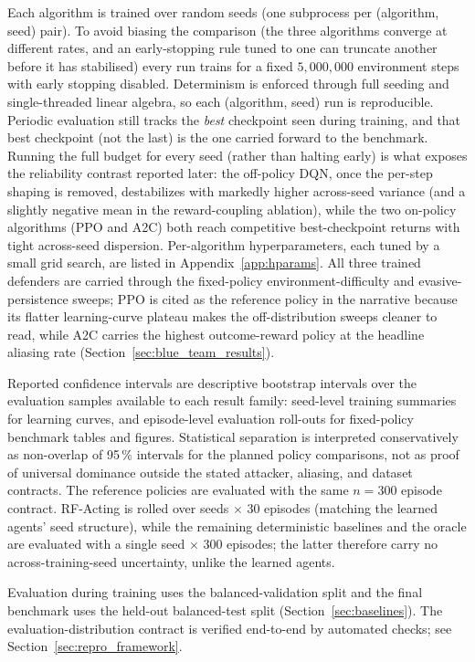Each algorithm is trained over \NumSeeds{} random seeds (one subprocess per (algorithm, seed) pair). To avoid biasing the comparison (the three algorithms converge at different rates, and an early-stopping rule tuned to one can truncate another before it has stabilised) every run trains for a fixed $5{,}000{,}000$ environment steps with early stopping disabled. Determinism is enforced through full seeding and single-threaded linear algebra, so each (algorithm, seed) run is reproducible. Periodic evaluation still tracks the \emph{best} checkpoint seen during training, and that best checkpoint (not the last) is the one carried forward to the benchmark. Running the full budget for every seed (rather than halting early) is what exposes the reliability contrast reported later: the off-policy DQN, once the per-step shaping is removed, destabilizes with markedly higher across-seed variance (and a slightly negative mean in the reward-coupling ablation), while the two on-policy algorithms (PPO and A2C) both reach competitive best-checkpoint returns with tight across-seed dispersion. Per-algorithm hyperparameters, each tuned by a small grid search, are listed in Appendix~\ref{app:hparams}. All three trained defenders are carried through the fixed-policy environment-difficulty and evasive-persistence sweeps; PPO is cited as the reference policy in the narrative because its flatter learning-curve plateau makes the off-distribution sweeps cleaner to read, while A2C carries the highest outcome-reward policy at the headline aliasing rate (Section~\ref{sec:blue_team_results}).

Reported confidence intervals are descriptive bootstrap intervals over the evaluation samples available to each result family: seed-level training summaries for learning curves, and episode-level evaluation roll-outs for fixed-policy benchmark tables and figures. Statistical separation is interpreted conservatively as non-overlap of 95\,\% intervals for the planned policy comparisons, not as proof of universal dominance outside the stated attacker, aliasing, and dataset contracts. The reference policies are evaluated with the same $n = 300$ episode contract. RF-Acting is rolled over \NumSeeds{} seeds $\times$ 30 episodes (matching the learned agents' seed structure), while the remaining deterministic baselines and the oracle are evaluated with a single seed $\times$ 300 episodes; the latter therefore carry no across-training-seed uncertainty, unlike the learned agents.

Evaluation during training uses the balanced-validation split and the final benchmark uses the held-out balanced-test split (Section~\ref{sec:baselines}). The evaluation-distribution contract is verified end-to-end by automated checks; see Section~\ref{sec:repro_framework}.

